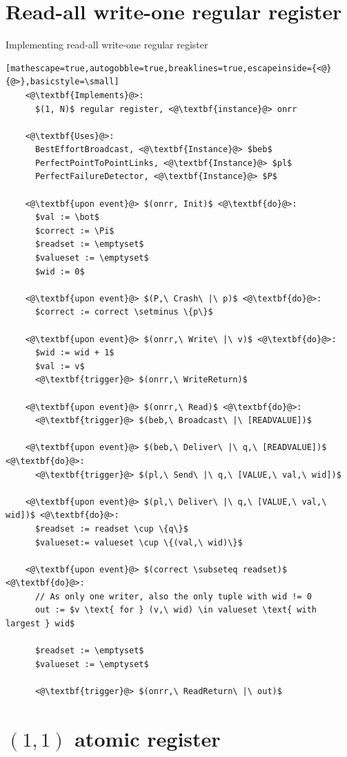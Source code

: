 \documentclass[a4paper]{scrreprt}
\begin{document}
\section{Read-all write-one regular register}

\begin{library}{Implementing read-all write-one regular register}
  \begin{lstlisting}[mathescape=true,autogobble=true,breaklines=true,escapeinside={<@}{@>},basicstyle=\small]
    <@\textbf{Implements}@>:
      $(1, N)$ regular register, <@\textbf{instance}@> onrr

    <@\textbf{Uses}@>:
      BestEffortBroadcast, <@\textbf{Instance}@> $beb$
      PerfectPointToPointLinks, <@\textbf{Instance}@> $pl$
      PerfectFailureDetector, <@\textbf{Instance}@> $P$

    <@\textbf{upon event}@> $(onrr, Init)$ <@\textbf{do}@>:
      $val := \bot$
      $correct := \Pi$
      $readset := \emptyset$
      $valueset := \emptyset$
      $wid := 0$

    <@\textbf{upon event}@> $(P,\ Crash\ |\ p)$ <@\textbf{do}@>:
      $correct := correct \setminus \{p\}$

    <@\textbf{upon event}@> $(onrr,\ Write\ |\ v)$ <@\textbf{do}@>:
      $wid := wid + 1$
      $val := v$
      <@\textbf{trigger}@> $(onrr,\ WriteReturn)$

    <@\textbf{upon event}@> $(onrr,\ Read)$ <@\textbf{do}@>:
      <@\textbf{trigger}@> $(beb,\ Broadcast\ |\ [READVALUE])$

    <@\textbf{upon event}@> $(beb,\ Deliver\ |\ q,\ [READVALUE])$ <@\textbf{do}@>:
      <@\textbf{trigger}@> $(pl,\ Send\ |\ q,\ [VALUE,\ val,\ wid])$

    <@\textbf{upon event}@> $(pl,\ Deliver\ |\ q,\ [VALUE,\ val,\ wid])$ <@\textbf{do}@>:
      $readset := readset \cup \{q\}$
      $valueset:= valueset \cup \{(val,\ wid)\}$

    <@\textbf{upon event}@> $(correct \subseteq readset)$ <@\textbf{do}@>:
      // As only one writer, also the only tuple with wid != 0
      out := $v \text{ for } (v,\ wid) \in valueset \text{ with largest } wid$

      $readset := \emptyset$
      $valueset := \emptyset$

      <@\textbf{trigger}@> $(onrr,\ ReadReturn\ |\ out)$

  \end{lstlisting}
\end{library}

\section{$(1, 1)$ atomic register}
\end{document}
